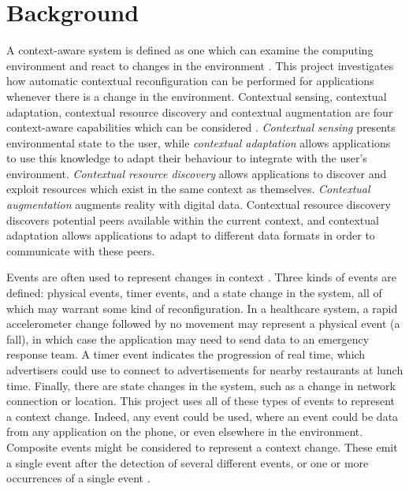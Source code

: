 \documentclass[12pt,twoside,notitlepage]{report}
\begin{document}
\section{Background}

A context-aware system is defined as one which can examine the computing environment and react to changes in the environment \cite{schilit1994context}. 
This project investigates how automatic contextual reconfiguration can be performed for applications whenever there is a change in the environment. 
Contextual sensing, contextual adaptation, contextual resource discovery and contextual augmentation are four context-aware capabilities which can be considered \cite{pascoe1998adding}.
{\sl Contextual sensing} presents environmental state to the user, while {\sl contextual adaptation} allows applications to use this knowledge to adapt their behaviour to integrate with the user's environment.
{\sl Contextual resource discovery} allows applications to discover and exploit resources which exist in the same context as themselves. 
{\sl Contextual augmentation} augments reality with digital data. 
Contextual resource discovery discovers potential peers available within the current context, and contextual adaptation allows applications to adapt to different data formats in order to communicate with these peers. 


Events are often used to represent changes in context \cite{muhl2006distributed,harter2002anatomy,baldauf2007survey,dey2001conceptual}.
Three kinds of events are defined: physical events, timer events, and a state change in the system, all of which may warrant some kind of reconfiguration. 
In a healthcare system, a rapid accelerometer change followed by no movement may represent a physical event (a fall), in which case the application may need to send data to an emergency response team.
A timer event indicates the progression of real time, which advertisers could use to connect to advertisements for nearby restaurants at lunch time. 
Finally, there are state changes in the system, such as a change in network connection or location. 
This project uses all of these types of events to represent a context change. 
Indeed, any event could be used, where an event could be data from any application on the phone, or even elsewhere in the environment. 
Composite events might be considered to represent a context change. 
These emit a single event after the detection of several different events, or one or more occurrences of a single event \cite{chakravarthy1994composite}. 
\end{document}
